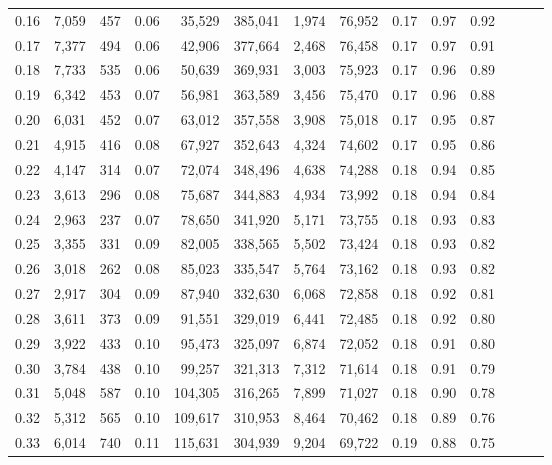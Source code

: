 \begin{tabular}{rrrrrrrrrrrrrr}
0.16 &   7,059 &    457 &  0.06 &   35,529 &  385,041 &   1,974 &  76,952 &  0.17 &  0.97 &      0.92 \\
0.17 &   7,377 &    494 &  0.06 &   42,906 &  377,664 &   2,468 &  76,458 &  0.17 &  0.97 &      0.91 \\
0.18 &   7,733 &    535 &  0.06 &   50,639 &  369,931 &   3,003 &  75,923 &  0.17 &  0.96 &      0.89 \\
0.19 &   6,342 &    453 &  0.07 &   56,981 &  363,589 &   3,456 &  75,470 &  0.17 &  0.96 &      0.88 \\
0.20 &   6,031 &    452 &  0.07 &   63,012 &  357,558 &   3,908 &  75,018 &  0.17 &  0.95 &      0.87 \\
0.21 &   4,915 &    416 &  0.08 &   67,927 &  352,643 &   4,324 &  74,602 &  0.17 &  0.95 &      0.86 \\
0.22 &   4,147 &    314 &  0.07 &   72,074 &  348,496 &   4,638 &  74,288 &  0.18 &  0.94 &      0.85 \\
0.23 &   3,613 &    296 &  0.08 &   75,687 &  344,883 &   4,934 &  73,992 &  0.18 &  0.94 &      0.84 \\
0.24 &   2,963 &    237 &  0.07 &   78,650 &  341,920 &   5,171 &  73,755 &  0.18 &  0.93 &      0.83 \\
0.25 &   3,355 &    331 &  0.09 &   82,005 &  338,565 &   5,502 &  73,424 &  0.18 &  0.93 &      0.82 \\
0.26 &   3,018 &    262 &  0.08 &   85,023 &  335,547 &   5,764 &  73,162 &  0.18 &  0.93 &      0.82 \\
0.27 &   2,917 &    304 &  0.09 &   87,940 &  332,630 &   6,068 &  72,858 &  0.18 &  0.92 &      0.81 \\
0.28 &   3,611 &    373 &  0.09 &   91,551 &  329,019 &   6,441 &  72,485 &  0.18 &  0.92 &      0.80 \\
0.29 &   3,922 &    433 &  0.10 &   95,473 &  325,097 &   6,874 &  72,052 &  0.18 &  0.91 &      0.80 \\
0.30 &   3,784 &    438 &  0.10 &   99,257 &  321,313 &   7,312 &  71,614 &  0.18 &  0.91 &      0.79 \\
0.31 &   5,048 &    587 &  0.10 &  104,305 &  316,265 &   7,899 &  71,027 &  0.18 &  0.90 &      0.78 \\
0.32 &   5,312 &    565 &  0.10 &  109,617 &  310,953 &   8,464 &  70,462 &  0.18 &  0.89 &      0.76 \\
0.33 &   6,014 &    740 &  0.11 &  115,631 &  304,939 &   9,204 &  69,722 &  0.19 &  0.88 &      0.75 \\

\end{tabular}
